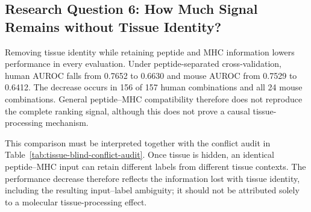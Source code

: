 \subsection{Research Question 6: How Much Signal Remains without Tissue Identity?}

Removing tissue identity while retaining peptide and MHC information lowers performance in every evaluation. Under peptide-separated cross-validation, human AUROC falls from 0.7652 to 0.6630 and mouse AUROC from 0.7529 to 0.6412. The decrease occurs in 156 of 157 human combinations and all 24 mouse combinations. General peptide--MHC compatibility therefore does not reproduce the complete ranking signal, although this does not prove a causal tissue-processing mechanism.

This comparison must be interpreted together with the conflict audit in Table~\ref{tab:tissue-blind-conflict-audit}. Once tissue is hidden, an identical peptide--MHC input can retain different labels from different tissue contexts. The performance decrease therefore reflects the information lost with tissue identity, including the resulting input--label ambiguity; it should not be attributed solely to a molecular tissue-processing effect.

